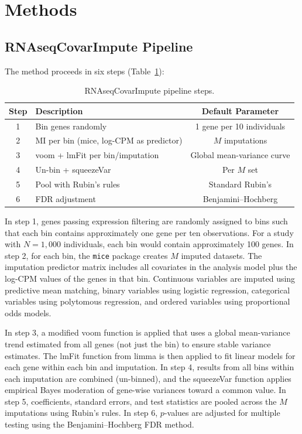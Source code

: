 \documentclass[11pt]{article}
\begin{document}
\section{Methods}

\subsection{RNAseqCovarImpute Pipeline}

The method proceeds in six steps (Table~\ref{tab:pipeline}):

\begin{table}[h]
\centering
\caption{RNAseqCovarImpute pipeline steps.}
\label{tab:pipeline}
\begin{tabular}{clc}
\toprule
Step & Description & Default Parameter \\
\midrule
1 & Bin genes randomly & 1 gene per 10 individuals \\
2 & MI per bin (mice, log-CPM as predictor) & $M$ imputations \\
3 & voom + lmFit per bin/imputation & Global mean-variance curve \\
4 & Un-bin + squeezeVar & Per $M$ set \\
5 & Pool with Rubin's rules & Standard Rubin's \\
6 & FDR adjustment & Benjamini--Hochberg \\
\bottomrule
\end{tabular}
\end{table}

In step 1, genes passing expression filtering are randomly assigned to bins such that each bin contains approximately one gene per ten observations. For a study with $N = 1{,}000$ individuals, each bin would contain approximately 100 genes. In step 2, for each bin, the \texttt{mice} package creates $M$ imputed datasets. The imputation predictor matrix includes all covariates in the analysis model plus the log-CPM values of the genes in that bin. Continuous variables are imputed using predictive mean matching, binary variables using logistic regression, categorical variables using polytomous regression, and ordered variables using proportional odds models.

In step 3, a modified voom function is applied that uses a global mean-variance trend estimated from all genes (not just the bin) to ensure stable variance estimates. The lmFit function from limma is then applied to fit linear models for each gene within each bin and imputation. In step 4, results from all bins within each imputation are combined (un-binned), and the squeezeVar function applies empirical Bayes moderation of gene-wise variances toward a common value. In step 5, coefficients, standard errors, and test statistics are pooled across the $M$ imputations using Rubin's rules. In step 6, $p$-values are adjusted for multiple testing using the Benjamini--Hochberg FDR method.
\end{document}
